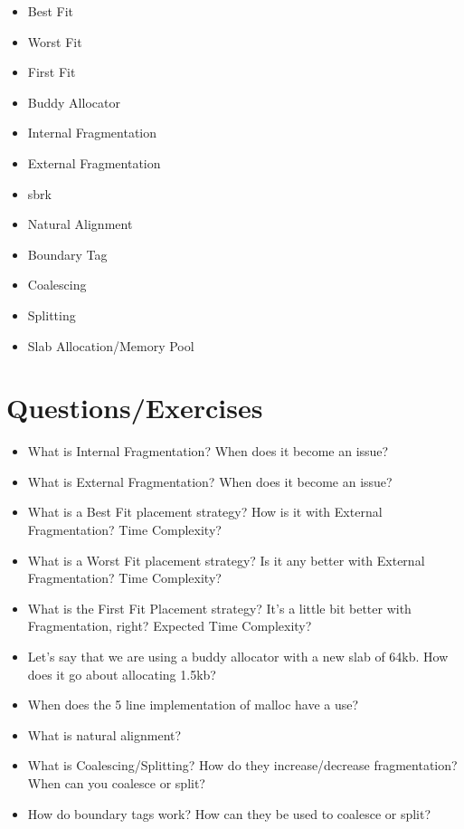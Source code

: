 \begin{itemize}
\item
  Best Fit
\item
  Worst Fit
\item
  First Fit
\item
  Buddy Allocator
\item
  Internal Fragmentation
\item
  External Fragmentation
\item
  sbrk
\item
  Natural Alignment
\item
  Boundary Tag
\item
  Coalescing
\item
  Splitting
\item
  Slab Allocation/Memory Pool
\end{itemize}

\section{Questions/Exercises}

\begin{itemize}
\tightlist
\item
  What is Internal Fragmentation? When does it become an issue?
\item
  What is External Fragmentation? When does it become an issue?
\item
  What is a Best Fit placement strategy? How is it with External Fragmentation? Time Complexity?
\item
  What is a Worst Fit placement strategy? Is it any better with External Fragmentation? Time Complexity?
\item
  What is the First Fit Placement strategy? It's a little bit better with Fragmentation, right? Expected Time Complexity?
\item
  Let's say that we are using a buddy allocator with a new slab of 64kb. How does it go about allocating 1.5kb?
\item
  When does the 5 line  implementation of malloc have a use?
\item
  What is natural alignment?
\item
  What is Coalescing/Splitting? How do they increase/decrease fragmentation? When can you coalesce or split?
\item
  How do boundary tags work? How can they be used to coalesce or split?
\end{itemize}



